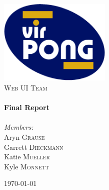 %

\begin{titlepage}
	\begin{center}

		\includegraphics[width=0.40\textwidth]{./logo.png}\\[1cm]

		\textsc{\large Web UI Team}\\[1.5cm]

		\HRule \\[0.4cm]
			{\huge \bfseries Final Report}\\[0.4cm]
		\HRule \\[1.5cm]

		\emph{Members:}\\
		Aryn \textsc{Grause}\\
		Garrett \textsc{Dieckmann}\\
		Katie \textsc{Mueller}\\
		Kyle \textsc{Monnett}\\
		
		\vfill

		{\large \today}
		
	\end{center}
\end{titlepage}